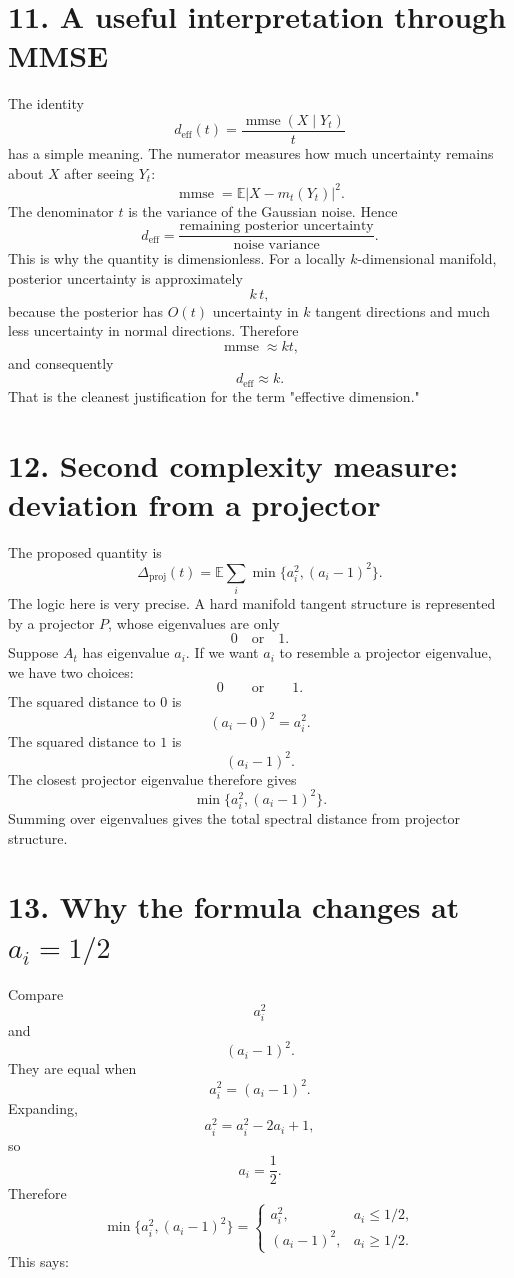 \documentclass{article}
\begin{document}
\section*{11. A useful interpretation through MMSE}
The identity
\[
d_{\mathrm{eff}}(t) = \frac{\operatorname{mmse}(X\mid Y_t)}{t}
\]
has a simple meaning.
The numerator measures how much uncertainty remains about $X$ after seeing $Y_t$:
\[
\operatorname{mmse} = \mathbb E|X-m_t(Y_t)|^2.
\]
The denominator $t$ is the variance of the Gaussian noise.
Hence
\[
\boxed{
d_{\mathrm{eff}} = \frac{\text{remaining posterior uncertainty}}{\text{noise variance}}.
}
\]
This is why the quantity is dimensionless.
For a locally $k$-dimensional manifold, posterior uncertainty is approximately
\[
k\,t,
\]
because the posterior has $O(t)$ uncertainty in $k$ tangent directions and much less uncertainty in normal directions. Therefore
\[
\operatorname{mmse} \approx kt,
\]
and consequently
\[
d_{\mathrm{eff}} \approx k.
\]
That is the cleanest justification for the term "effective dimension."

\section*{12. Second complexity measure: deviation from a projector}
The proposed quantity is
\[
\boxed{
\Delta_{\mathrm{proj}}(t) = \mathbb E \sum_i \min\{a_i^2,(a_i-1)^2\}.
}
\]
The logic here is very precise.
A hard manifold tangent structure is represented by a projector $P$, whose eigenvalues are only
\[
0 \quad\text{or}\quad 1.
\]
Suppose $A_t$ has eigenvalue $a_i$.
If we want $a_i$ to resemble a projector eigenvalue, we have two choices:
\[
0 \qquad\text{or}\qquad 1.
\]
The squared distance to $0$ is
\[
(a_i-0)^2 = a_i^2.
\]
The squared distance to $1$ is
\[
(a_i-1)^2.
\]
The closest projector eigenvalue therefore gives
\[
\boxed{
\min\{a_i^2,(a_i-1)^2\}.
}
\]
Summing over eigenvalues gives the total spectral distance from projector structure.

\section*{13. Why the formula changes at $a_i=1/2$}
Compare
\[
a_i^2
\]
and
\[
(a_i-1)^2.
\]
They are equal when
\[
a_i^2 = (a_i-1)^2.
\]
Expanding,
\[
a_i^2 = a_i^2 - 2a_i + 1,
\]
so
\[
a_i = \frac12.
\]
Therefore
\[
\min\{a_i^2,(a_i-1)^2\} =
\begin{cases}
a_i^2,& a_i\le1/2,\\[1ex]
(a_i-1)^2,& a_i\ge1/2.
\end{cases}
\]
This says:
\end{document}
